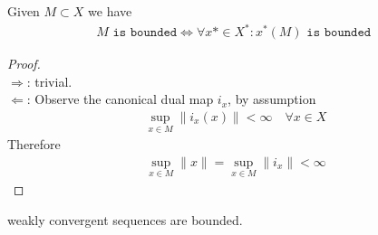 \begin{corollary}
	Given $M \subset X$ we have
	\begin{align*}
		M \texttt{ is bounded} \Leftrightarrow \forall x* \in X^*:  x^*(M) \texttt{ is bounded }
	\end{align*}
\end{corollary}
\begin{proof}
\quad\\
$\Rightarrow$: trivial.\\
$\Leftarrow$: Observe the canonical dual map $i_x$, by assumption
\begin{align*}
	\sup_{x \in M} \|i_x(x)\| < \infty \quad \forall x \in X
\end{align*}
Therefore
\begin{align*}
	\sup_{x \in M} \|x\| = \sup_{x \in M}\|i_x\| < \infty
\end{align*}
\end{proof}

\begin{corollary}
	weakly convergent sequences are bounded. 
\end{corollary}

